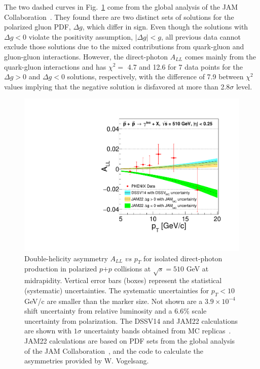\documentclass[twocolumn,letterpaper,aps,prl,longbibliography,superscriptaddress,floatfix]{revtex4-2}
\newcommand{\ALL}{\mbox{$A_{LL}$}\xspace}
\begin{document}
The two dashed curves in Fig.~\ref{fig:all} come from the global
analysis of the JAM Collaboration~\cite{PhysRevD.105.074022,PhysRevD.106.L031502}.
They found there are two distinct sets of solutions for the polarized gluon PDF,
$\Delta g$, which differ in sign. Even though the solutions with
$\Delta g<0$ violate the positivity assumption, $|\Delta g|<g$, all
previous data cannot exclude those solutions due to the mixed
contributions from quark-gluon and gluon-gluon interactions. However,
the direct-photon \ALL comes mainly from the quark-gluon interactions and
has $\chi^2 =$ 4.7 and 12.6 for 7 data points for the $\Delta g>0$ and $\Delta g<0$
solutions, respectively, with the difference of 7.9 between $\chi^2$ values implying that
the negative solution is disfavored at more than 2.8$\sigma$ level.

\begin{figure}[htb]
\includegraphics[width=1.0\linewidth]{IsoPhotonALL-beam2.pdf}
\caption{Double-helicity asymmetry $A_{LL}$ $vs$ $p_{T}$ for isolated 
direct-photon production in polarized $p$$+$$p$ collisions at 
$\sqrt{s}=510$ GeV at midrapidity. Vertical error bars (boxes) represent 
the statistical (systematic) uncertainties. The systematic uncertainties
for $p_T < 10$ GeV/c are smaller than the marker size. Not shown are
a $3.9{\times}10^{-4}$ shift uncertainty from relative luminosity and 
a 6.6\% scale uncertainty from polarization. The DSSV14 and JAM22 calculations 
are shown with $1\sigma$ uncertainty bands obtained from MC
replicas~\protect\cite{PhysRevLett.101.072001,PhysRevLett.113.012001,PhysRevD.100.114027,PhysRevD.105.074022,PhysRevD.106.L031502}. 
JAM22 calculations are based on PDF sets from the global analysis of the
JAM Collaboration~\cite{PhysRevD.106.L031502}, and the code to calculate
the asymmetries provided by W. Vogelsang.
}
\label{fig:all}
\end{figure}
\end{document}
